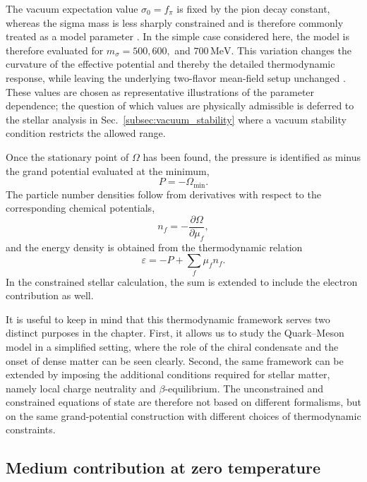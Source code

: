 The vacuum expectation value \(\sigma_0=f_\pi\) is fixed by the pion
decay constant, whereas the sigma mass is less sharply constrained and
is therefore commonly treated as a model parameter 
\cite{SchaeferWambach2008,SchaeferPawlowskiWambach2007,Buballa2005}.
In the simple case considered here, the model is therefore
evaluated for
\(m_\sigma=500,600,\) and \(700\,\mathrm{MeV}\). This
variation changes the curvature of the effective potential and thereby
the detailed thermodynamic response, while leaving the underlying
two-flavor mean-field setup unchanged \cite{Folkestad2018,Andersen2024}.
These values are chosen as representative illustrations of the parameter
dependence; the question of which values are physically admissible is
deferred to the stellar analysis in Sec.~\ref{subsec:vacuum_stability}
where a vacuum stability condition restricts the allowed range.

Once the stationary point of $\Omega$ has been found, the pressure is
identified as minus the grand potential evaluated at the minimum,
\begin{equation}
P = -\Omega_{\min}.
\label{eq:qs_pressure_def}
\end{equation}
The particle number densities follow from derivatives with respect to
the corresponding chemical potentials,
\begin{equation}
n_f = -\frac{\partial \Omega}{\partial \mu_f},
\label{eq:qs_density_def}
\end{equation}
and the energy density is obtained from the thermodynamic relation
\begin{equation}
\varepsilon = -P + \sum_f \mu_f n_f.
\label{eq:qs_energy_def}
\end{equation}
In the constrained stellar calculation, the sum is extended to include
the electron contribution as well.

It is useful to keep in mind that this thermodynamic framework serves
two distinct purposes in the chapter. First, it allows us to study the
Quark--Meson model in a simplified setting, where the role of the
chiral condensate and the onset of dense matter can be seen clearly.
Second, the same framework can be extended by imposing the additional
conditions required for stellar matter, namely local charge neutrality
and $\beta$-equilibrium. The unconstrained and constrained equations of
state are therefore not based on different formalisms, but on the same
grand-potential construction with different choices of thermodynamic
constraints.

\subsection*{Medium contribution at zero temperature}

